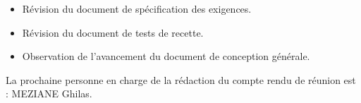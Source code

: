 \documentclass[a4paper, 12pt]{article}
\begin{document}
\begin{itemize}
    \item Révision du document de spécification des exigences.
    \item Révision du document de tests de recette.
    \item Observation de l'avancement du document de conception générale. \\
\end{itemize}

La prochaine personne en charge de la rédaction du compte rendu de réunion est : MEZIANE Ghilas.
\end{document}
